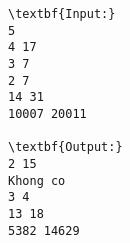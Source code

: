 \begin{verbatim}
\textbf{Input:}
5
4 17
3 7
2 7
14 31
10007 20011

\textbf{Output:}
2 15
Khong co
3 4
13 18
5382 14629
\end{verbatim}